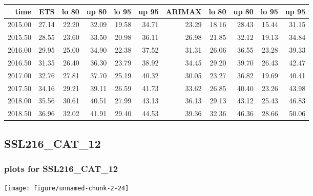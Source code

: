 \documentclass[10pt,a4paper]{article}\usepackage[]{graphicx}\usepackage[]{color}
\makeatletter
\def\maxwidth{ %
  \ifdim\Gin@nat@width>\linewidth
    \linewidth
  \else
    \Gin@nat@width
  \fi
}
\newcommand{\AaA}{\_}
\makeatother
\begin{document}
\begin{table}[ht]
\centering
\begin{tabular}{rrrrrrrrrrr}
  \hline
time & ETS  & lo 80 & up 80 & lo 95 & up 95 & ARIMAX  & lo 80 & up 80 & lo 95 & up 95 \\ 
  \hline
2015.00 & 27.14 & 22.20 & 32.09 & 19.58 & 34.71 & 23.29 & 18.16 & 28.43 & 15.44 & 31.15 \\ 
  2015.50 & 28.55 & 23.60 & 33.50 & 20.98 & 36.11 & 26.98 & 21.85 & 32.12 & 19.13 & 34.84 \\ 
  2016.00 & 29.95 & 25.00 & 34.90 & 22.38 & 37.52 & 31.31 & 26.06 & 36.55 & 23.28 & 39.33 \\ 
  2016.50 & 31.35 & 26.40 & 36.30 & 23.79 & 38.92 & 34.45 & 29.20 & 39.70 & 26.43 & 42.47 \\ 
  2017.00 & 32.76 & 27.81 & 37.70 & 25.19 & 40.32 & 30.05 & 23.27 & 36.82 & 19.69 & 40.41 \\ 
  2017.50 & 34.16 & 29.21 & 39.11 & 26.59 & 41.73 & 33.62 & 26.85 & 40.40 & 23.26 & 43.98 \\ 
  2018.00 & 35.56 & 30.61 & 40.51 & 27.99 & 43.13 & 36.13 & 29.13 & 43.12 & 25.43 & 46.83 \\ 
  2018.50 & 36.96 & 32.02 & 41.91 & 29.40 & 44.53 & 39.36 & 32.36 & 46.36 & 28.66 & 50.06 \\ 
   \hline
\end{tabular}
\end{table}

\newpage
\subsection{SSL216\AaA CAT\AaA 12}
\subsubsection{plots for SSL216\AaA CAT\AaA 12}

\texttt{[image: figure/unnamed-chunk-2-24]} 

\newpage
\end{document}
